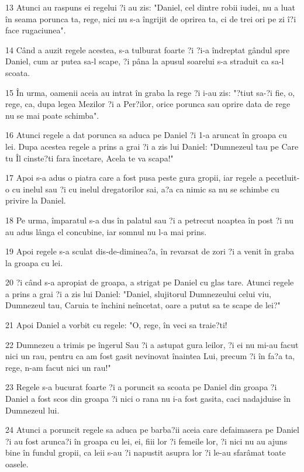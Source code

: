 \par 13 Atunci au raspuns ei regelui ?i au zis: "Daniel, cel dintre robii iudei, nu a luat în seama porunca ta, rege, nici nu s-a îngrijit de oprirea ta, ci de trei ori pe zi î?i face rugaciunea".
\par 14 Când a auzit regele acestea, s-a tulburat foarte ?i ?i-a îndreptat gândul spre Daniel, cum ar putea sa-l scape, ?i pâna la apusul soarelui s-a straduit ca sa-l scoata.
\par 15 În urma, oamenii aceia au intrat în graba la rege ?i i-au zis: "?tiut sa-?i fie, o, rege, ca, dupa legea Mezilor ?i a Per?ilor, orice porunca sau oprire data de rege nu se mai poate schimba".
\par 16 Atunci regele a dat porunca sa aduca pe Daniel ?i 1-a aruncat în groapa cu lei. Dupa acestea regele a prins a grai ?i a zis lui Daniel: "Dumnezeul tau pe Care tu Îl cinste?ti fara încetare, Acela te va scapa!"
\par 17 Apoi s-a adus o piatra care a fost pusa peste gura gropii, iar regele a pecetluit-o cu inelul sau ?i cu inelul dregatorilor sai, a?a ca nimic sa nu se schimbe cu privire la Daniel.
\par 18 Pe urma, împaratul s-a dus în palatul sau ?i a petrecut noaptea în post ?i nu au adus lânga el concubine, iar somnul nu l-a mai prins.
\par 19 Apoi regele s-a sculat dis-de-diminea?a, în revarsat de zori ?i a venit în graba la groapa cu lei.
\par 20 ?i când s-a apropiat de groapa, a strigat pe Daniel cu glas tare. Atunci regele a prins a grai ?i a zis lui Daniel: "Daniel, slujitorul Dumnezeului celui viu, Dumnezeul tau, Caruia te închini neîncetat, oare a putut sa te scape de lei?"
\par 21 Apoi Daniel a vorbit cu regele: "O, rege, în veci sa traie?ti!
\par 22 Dumnezeu a trimis pe îngerul Sau ?i a astupat gura leilor, ?i ei nu mi-au facut nici un rau, pentru ca am fost gasit nevinovat înaintea Lui, precum ?i în fa?a ta, rege, n-am facut nici un rau!"
\par 23 Regele s-a bucurat foarte ?i a poruncit sa scoata pe Daniel din groapa ?i Daniel a fost scos din groapa ?i nici o rana nu i-a fost gasita, caci nadajduise în Dumnezeul lui.
\par 24 Atunci a poruncit regele sa aduca pe barba?ii aceia care defaimasera pe Daniel ?i au fost arunca?i în groapa cu lei, ei, fiii lor ?i femeile lor, ?i nici nu au ajuns bine în fundul gropii, ca leii s-au ?i napustit asupra lor ?i le-au sfarâmat toate oasele.
